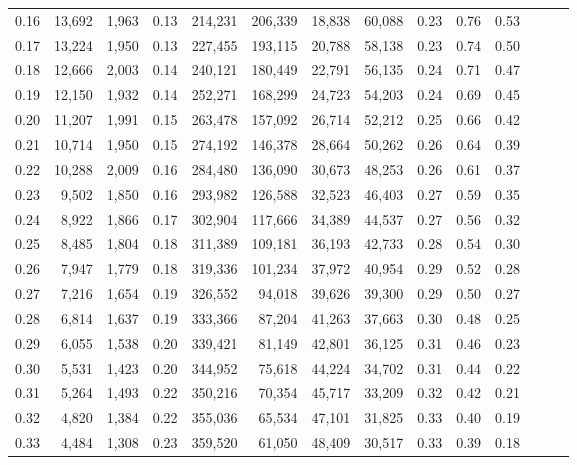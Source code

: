 \begin{tabular}{rrrrrrrrrrrrrr}
0.16 &  13,692 &  1,963 &  0.13 &  214,231 &  206,339 &  18,838 &  60,088 &  0.23 &  0.76 &      0.53 \\
0.17 &  13,224 &  1,950 &  0.13 &  227,455 &  193,115 &  20,788 &  58,138 &  0.23 &  0.74 &      0.50 \\
0.18 &  12,666 &  2,003 &  0.14 &  240,121 &  180,449 &  22,791 &  56,135 &  0.24 &  0.71 &      0.47 \\
0.19 &  12,150 &  1,932 &  0.14 &  252,271 &  168,299 &  24,723 &  54,203 &  0.24 &  0.69 &      0.45 \\
0.20 &  11,207 &  1,991 &  0.15 &  263,478 &  157,092 &  26,714 &  52,212 &  0.25 &  0.66 &      0.42 \\
0.21 &  10,714 &  1,950 &  0.15 &  274,192 &  146,378 &  28,664 &  50,262 &  0.26 &  0.64 &      0.39 \\
0.22 &  10,288 &  2,009 &  0.16 &  284,480 &  136,090 &  30,673 &  48,253 &  0.26 &  0.61 &      0.37 \\
0.23 &   9,502 &  1,850 &  0.16 &  293,982 &  126,588 &  32,523 &  46,403 &  0.27 &  0.59 &      0.35 \\
0.24 &   8,922 &  1,866 &  0.17 &  302,904 &  117,666 &  34,389 &  44,537 &  0.27 &  0.56 &      0.32 \\
0.25 &   8,485 &  1,804 &  0.18 &  311,389 &  109,181 &  36,193 &  42,733 &  0.28 &  0.54 &      0.30 \\
0.26 &   7,947 &  1,779 &  0.18 &  319,336 &  101,234 &  37,972 &  40,954 &  0.29 &  0.52 &      0.28 \\
0.27 &   7,216 &  1,654 &  0.19 &  326,552 &   94,018 &  39,626 &  39,300 &  0.29 &  0.50 &      0.27 \\
0.28 &   6,814 &  1,637 &  0.19 &  333,366 &   87,204 &  41,263 &  37,663 &  0.30 &  0.48 &      0.25 \\
0.29 &   6,055 &  1,538 &  0.20 &  339,421 &   81,149 &  42,801 &  36,125 &  0.31 &  0.46 &      0.23 \\
0.30 &   5,531 &  1,423 &  0.20 &  344,952 &   75,618 &  44,224 &  34,702 &  0.31 &  0.44 &      0.22 \\
0.31 &   5,264 &  1,493 &  0.22 &  350,216 &   70,354 &  45,717 &  33,209 &  0.32 &  0.42 &      0.21 \\
0.32 &   4,820 &  1,384 &  0.22 &  355,036 &   65,534 &  47,101 &  31,825 &  0.33 &  0.40 &      0.19 \\
0.33 &   4,484 &  1,308 &  0.23 &  359,520 &   61,050 &  48,409 &  30,517 &  0.33 &  0.39 &      0.18 \\

\end{tabular}
